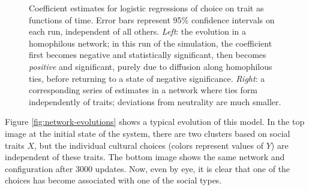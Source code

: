 \documentclass{article}
\begin{document}
\begin{multicols}{2}
\begin{figure}
  \begin{center}
  \end{center}
  \caption{Coefficient estimates for logistic regressions of choice on trait as
    functions of time. Error bars represent 95\% confidence intervals on each
    run, independent of all others.  {\em Left}: the evolution in a homophilous
    network; in this run of the simulation, the coefficient first becomes
    negative and statistically significant, then becomes {\em positive} and
    significant, purely due to diffusion along homophilous ties, before
    returning to a state of negative significance.  {\em Right}: a
    corresponding series of estimates in a network where ties form
    independently of traits; deviations from neutrality are much smaller.}
\label{fig:network-correlations}
\end{figure}

Figure \ref{fig:network-evolutions} shows a typical evolution of this model. In
the top image at the initial state of the system, there are two clusters based
on social traits $X$, but the individual cultural choices (colors represent
values of $Y$) are independent of these traits. The bottom image shows the same
network and configuration after 3000 updates.  Now, even by eye, it is clear
that one of the choices has become associated with one of the social types.


\end{multicols}
\end{document}
